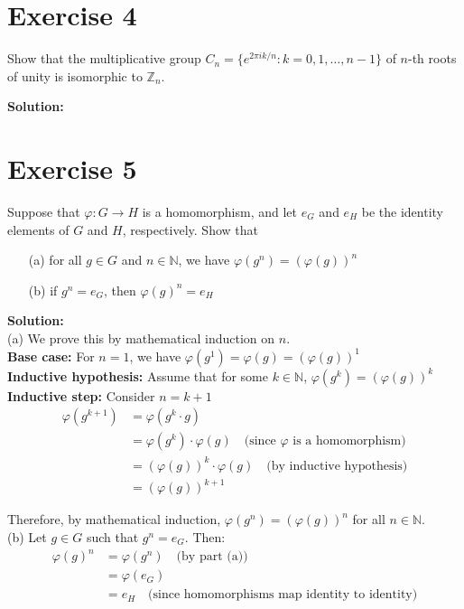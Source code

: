 \documentclass{article}
\begin{document}
\newpage

\section*{Exercise 4}
Show that the multiplicative group $C_n = \{e^{2\pi i k/n} : k = 0,1,\ldots,n-1\}$ of $n$-th roots of unity is isomorphic to $\mathbb{Z}_n$.

\textbf{Solution:}
\newpage

\section*{Exercise 5}
Suppose that $\varphi: G \to H$ is a homomorphism, and let $e_G$ and $e_H$ be the identity elements of $G$ and $H$, respectively. Show that
\begin{itemize}
\item[(a)] for all $g \in G$ and $n \in \mathbb{N}$, we have $\varphi(g^n) = (\varphi(g))^n$
\item[(b)] if $g^n = e_G$, then $\varphi(g)^n = e_H$
\end{itemize}

\textbf{Solution:} \\

(a) We prove this by mathematical induction on $n$. \\

\textbf{Base case:} For $n = 1$, we have
$\varphi(g^1) = \varphi(g) = (\varphi(g))^1$ \\

\textbf{Inductive hypothesis:} Assume that for some $k \in \mathbb{N}$, 
$\varphi(g^k) = (\varphi(g))^k$ \\

\textbf{Inductive step:} Consider $n = k + 1$
\begin{align*}
\varphi(g^{k+1}) &= \varphi(g^k \cdot g) \\
&= \varphi(g^k) \cdot \varphi(g) \quad \text{(since $\varphi$ is a homomorphism)} \\
&= (\varphi(g))^k \cdot \varphi(g) \quad \text{(by inductive hypothesis)} \\
&= (\varphi(g))^{k+1}
\end{align*}

Therefore, by mathematical induction, $\varphi(g^n) = (\varphi(g))^n$ for all $n \in \mathbb{N}$. \\

(b) Let $g \in G$ such that $g^n = e_G$. Then:
\begin{align*}
\varphi(g)^n &= \varphi(g^n) \quad \text{(by part (a))} \\
&= \varphi(e_G) \\
&= e_H \quad \text{(since homomorphisms map identity to identity)}
\end{align*}
\end{document}
